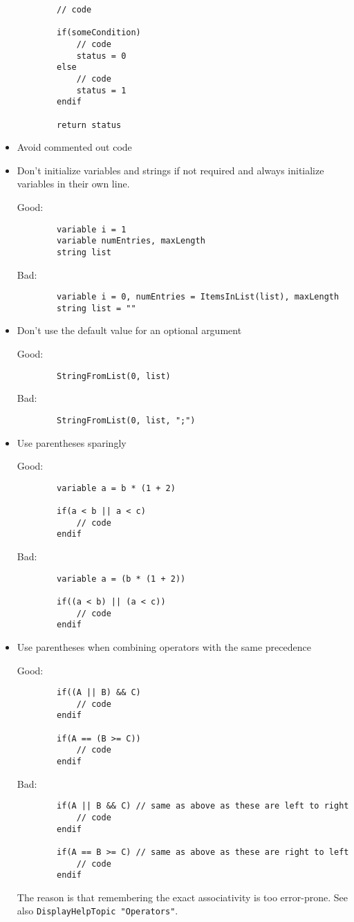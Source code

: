 \documentclass{scrartcl}
\begin{document}
\begin{itemize}
\begin{minipage}{\textwidth}
\begin{verbatim}
		// code

		if(someCondition)
			// code
			status = 0
		else
			// code
			status = 1
		endif

		return status
	\end{verbatim}
	\end{minipage}
%
	\item Avoid commented out code
%
	\item Don't initialize variables and strings if not required and always initialize variables in their own line.\par
	Good:
	\begin{verbatim}
		variable i = 1
		variable numEntries, maxLength
		string list
	\end{verbatim}
	Bad:
	\begin{verbatim}
		variable i = 0, numEntries = ItemsInList(list), maxLength
		string list = ""
	\end{verbatim}
%
	\item Don't use the default value for an optional argument\par
	Good:
	\begin{verbatim}
		StringFromList(0, list)
	\end{verbatim}
	Bad:
	\begin{verbatim}
		StringFromList(0, list, ";")
	\end{verbatim}
%
	\item Use parentheses sparingly\par
	Good:
	\begin{verbatim}
		variable a = b * (1 + 2)

		if(a < b || a < c)
			// code
		endif
	\end{verbatim}
	\begin{minipage}{\textwidth}
	Bad:
	\begin{verbatim}
		variable a = (b * (1 + 2))

		if((a < b) || (a < c))
			// code
		endif
	\end{verbatim}
	\end{minipage}
	\item Use parentheses when combining operators with the same precedence\par
	Good:
	\begin{verbatim}
		if((A || B) && C)
			// code
		endif

		if(A == (B >= C))
			// code
		endif
	\end{verbatim}
	Bad:
	\begin{verbatim}
		if(A || B && C) // same as above as these are left to right
			// code
		endif

		if(A == B >= C) // same as above as these are right to left
			// code
		endif
	\end{verbatim}
	The reason is that remembering the exact associativity is too error-prone. See also \texttt{DisplayHelpTopic "Operators"}.
	\end{itemize}
\end{document}
